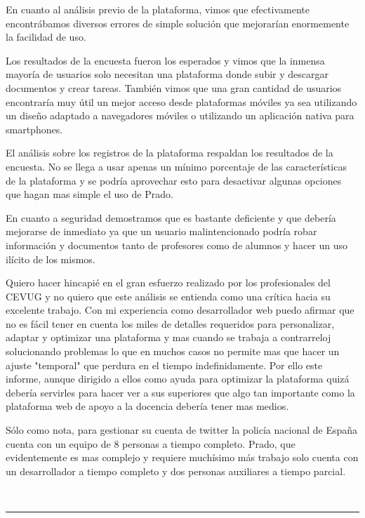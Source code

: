 {{\bigskip
En cuanto al análisis previo de la plataforma, vimos que efectivamente encontrábamos diversos errores de simple solución que mejorarían enormemente la facilidad de uso.

\bigskip
Los resultados de la encuesta fueron los esperados y vimos que la inmensa mayoría de usuarios solo necesitan una plataforma donde subir y descargar documentos y crear tareas. También vimos que una gran cantidad de usuarios encontraría muy útil un mejor acceso desde plataformas móviles ya sea utilizando un diseño adaptado a navegadores móviles o utilizando un aplicación nativa para smartphones.

\bigskip
El análisis sobre los registros de la plataforma respaldan los resultados de la encuesta. No se llega a usar apenas un mínimo porcentaje de las características de la plataforma y se podría aprovechar esto para desactivar algunas opciones que hagan mas simple el uso de Prado.

\bigskip
En cuanto a seguridad demostramos que es bastante deficiente y que debería mejorarse de inmediato ya que un usuario malintencionado podría robar información y documentos tanto de profesores como de alumnos y hacer un uso ilícito de los mismos.

\bigskip
Quiero hacer hincapié en el gran esfuerzo realizado por los profesionales del CEVUG y no quiero que este análisis se entienda como una crítica hacia su excelente trabajo. Con mi experiencia como desarrollador web puedo afirmar que no es fácil tener en cuenta los miles de detalles requeridos para personalizar, adaptar y optimizar una plataforma y mas cuando se trabaja a contrarreloj solucionando problemas lo que en muchos casos no permite mas que hacer un ajuste "temporal" que perdura en el tiempo indefinidamente. Por ello este informe, aunque dirigido a ellos como ayuda para optimizar la plataforma quizá debería servirles para hacer ver a sus superiores que algo tan importante como la plataforma web de apoyo a la docencia debería tener mas medios.

\bigskip
Sólo como nota, para gestionar su cuenta de twitter la policía nacional de España cuenta con un equipo de 8 personas a tiempo completo. Prado, que evidentemente es mas complejo y requiere muchísimo más trabajo solo cuenta con un desarrollador a tiempo completo y dos personas auxiliares a tiempo parcial.

\newpage
\thispagestyle{empty}
\
\vspace{3cm}

\noindent\rule[-1ex]{\textwidth}{2pt}\\[4.5ex]

}}
